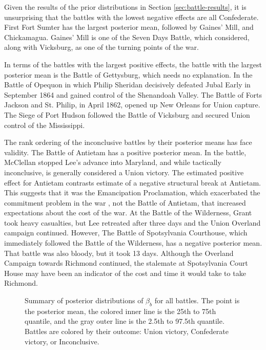 \documentclass[11pt, oneside, article]{memoir}
\begin{document}
Given the results of the prior distributions in Section \ref{sec:battle-results}, it is unsurprising that the battles with the lowest negative effects are all Confederate.
First Fort Sumter has the largest posterior mean, followed by Gaines' Mill, and Chickamagua.
Gaines' Mill is one of the Seven Days Battle, which \textcite{Fuller1956} considered, along with Vicksburg, as one of the turning points of the war.

In terms of the battles with the largest positive effects, the battle with the largest posterior mean is the Battle of Gettysburg, which needs no explanation. 
In the Battle of Opequon in which Philip Sheridan decisively defeated Jubal Early in September 1864 and gained control of the Shenandoah Valley.
The Battle of Forts Jackson and St. Philip, in April 1862, opened up New Orleans for Union capture.
The Siege of Port Hudson followed the Battle of Vicksburg and secured Union control of the Mississippi.

The rank ordering of the inconclusive battles by their posterior means has face validity.
The Battle of Antietam has a positive posterior mean.
In the battle, McClellan stopped Lee's advance into Maryland, and while tactically inconclusive, is generally considered a Union victory.
The estimated positive effect for Antietam contrasts \textcite{WillardGuinnaneEtAl1996} estimate of a negative structural break at Antietam.
This suggests that it was the Emancipation Proclamation, which exacerbated the commitment problem in the war \textcite{Reiter2009}, not the Battle of Antietam, that increased expectations about the cost of the war.
At the Battle of the Wilderness, Grant took heavy casualties, but Lee retreated after three days and the Union Overland campaign continued.
However, The Battle of Spotsylvania Courthouse, which immediately followed the Battle of the Wilderness, has a negative posterior mean.
That battle was also bloody, but it took 13 days.
Although the Overland Campaign towards Richmond continued, the stalemate at Spotsylvania Court House may have been an indicator of the cost and time it would take to take Richmond.

\begin{figure}[htpb]
  \caption{Summary of posterior distributions of $\beta_{b}$ for all battles.
    The point is the posterior mean, the colored inner line is the 25th to 75th quantile, and the gray outer line is the 2.5th to 97.5th quantile.
    Battles are colored by their outcome: Union victory, Confederate victory, or Inconclusive.
  }
  \label{fig:battle_effects}
\end{figure}
\end{document}
